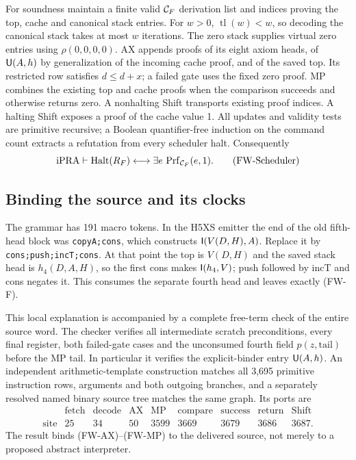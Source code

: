 For soundness maintain a finite valid $\mathcal C_F$ derivation list and
indices proving the top, cache and canonical stack entries.  For
$w>0$, $\operatorname{tl}(w)<w$, so decoding the canonical stack takes
at most $w$ iterations.  The zero stack supplies virtual zero entries
using $\rho(0,0,0,0)$.  AX appends proofs of its eight axiom heads, of
$\mathsf U(A,h)$ by generalization of the incoming cache proof, and of the
saved top.  Its restricted row satisfies $d\le d+x$; a failed gate
uses the fixed zero proof.  MP combines the existing top and cache
proofs when the comparison succeeds and otherwise returns zero.  A
nonhalting Shift transports existing proof indices.  A halting Shift
exposes a proof of the cache value 1.  All updates and validity tests are
primitive recursive; a Boolean quantifier-free induction on the command
count extracts a refutation from every scheduler halt.  Consequently
\[
 \mathrm{iPRA}\vdash\operatorname{Halt}(R_F)
       \longleftrightarrow
       \exists e\,\operatorname{Prf}_{\mathcal C_F}(e,1).      \tag{FW-Scheduler}
\]

\subsection{Binding the source and its clocks}

The grammar has 191 macro tokens.  In the H5XS emitter the end of the
old fifth-head block was \texttt{copyA;cons}, which constructs
$\mathsf I(V(D,H),A)$.  Replace it by
\texttt{cons;push;incT;cons}.  At that point the top is $V(D,H)$
and the saved stack head is $h_4(D,A,H)$, so the first cons makes
$\mathsf I(h_4,V)$; push followed by incT and cons negates it.  This
consumes the separate fourth head and leaves exactly (FW-F).

This local explanation is accompanied by a complete free-term check of
the entire source word.  The checker verifies all intermediate scratch
preconditions, every final register, both failed-gate cases and the
unconsumed fourth field $p(z,\mathrm{tail})$ before the MP tail.  In
particular it verifies the explicit-binder entry $\mathsf U(A,h)$.  An
independent arithmetic-template construction matches all 3,695 primitive
instruction rows, arguments and both outgoing branches, and a separately
resolved named binary source tree matches the same graph.  Its ports are
\[
\begin{array}{c|rrrrrrrr}
 &\mathrm{fetch}&\mathrm{decode}&\mathrm{AX}&\mathrm{MP}&
 \mathrm{compare}&\mathrm{success}&\mathrm{return}&\mathrm{Shift}\\\hline
 \mathrm{site}&25&34&50&3599&3669&3679&3686&3687.
\end{array}
\]
The result binds (FW-AX)--(FW-MP) to the delivered source, not merely to
a proposed abstract interpreter.

